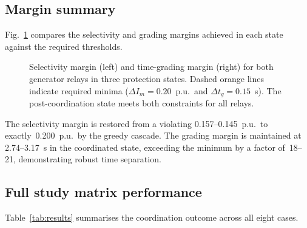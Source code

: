 \documentclass[journal,twoside,letterpaper]{IEEEtran}
\begin{document}
\subsection{Margin summary}

Fig.~\ref{fig:margins} compares the selectivity and
grading margins achieved in each state against the
required thresholds.

\begin{figure}[!t]
  \centering
  
  \caption{Selectivity margin (left) and time-grading
    margin (right) for both generator relays in three
    protection states.
    Dashed orange lines indicate required minima
    ($\Delta I_m = 0.20$~p.u.\ and
     $\Delta t_g = 0.15$~s).
    The post-coordination state meets both constraints
    for all relays.}
  \label{fig:margins}
\end{figure}

The selectivity margin is restored from a violating
0.157--0.145~p.u.\ to exactly~0.200~p.u.\ by the
greedy cascade.
The grading margin is maintained at 2.74--3.17~s in the
coordinated state, exceeding the minimum by a factor
of~18--21, demonstrating robust time separation.

\subsection{Full study matrix performance}

Table~\ref{tab:results} summarises the coordination
outcome across all eight cases.
\end{document}
